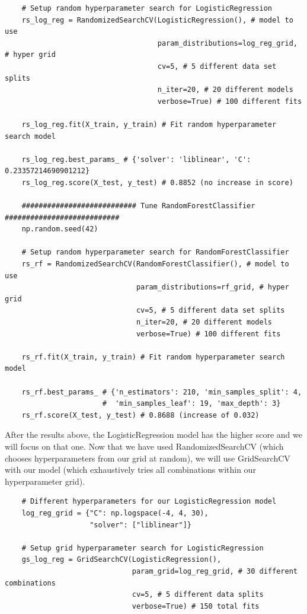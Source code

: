 \documentclass[11pt, a4paper]{article}
\begin{document}
\begin{spacing}{1.1}
\begin{lstlisting}
	# Setup random hyperparameter search for LogisticRegression
	rs_log_reg = RandomizedSearchCV(LogisticRegression(), # model to use
	                                param_distributions=log_reg_grid, # hyper grid
	                                cv=5, # 5 different data set splits
	                                n_iter=20, # 20 different models
	                                verbose=True) # 100 different fits
	
	rs_log_reg.fit(X_train, y_train) # Fit random hyperparameter search model
	
	rs_log_reg.best_params_ # {'solver': 'liblinear', 'C': 0.23357214690901212}
	rs_log_reg.score(X_test, y_test) # 0.8852 (no increase in score)
	
	########################### Tune RandomForestClassifier ###########################
	np.random.seed(42)
	
	# Setup random hyperparameter search for RandomForestClassifier
	rs_rf = RandomizedSearchCV(RandomForestClassifier(), # model to use
	                           param_distributions=rf_grid, # hyper grid
	                           cv=5, # 5 different data set splits
	                           n_iter=20, # 20 different models
	                           verbose=True) # 100 different fits
	
	rs_rf.fit(X_train, y_train) # Fit random hyperparameter search model 
	
	rs_rf.best_params_ # {'n_estimators': 210, 'min_samples_split': 4, 
	                   #  'min_samples_leaf': 19, 'max_depth': 3}
	rs_rf.score(X_test, y_test) # 0.8688 (increase of 0.032) \end{lstlisting} \newpage

	\noindent After the results above, the LogisticRegression model has the higher score and we will focus on that one. Now that we have used RandomizedSearchCV (which chooses hyperparameters from our grid at random), we will use GridSearchCV with our model (which exhaustively tries all combinations within our hyperparameter grid). 
	\begin{lstlisting}
	# Different hyperparameters for our LogisticRegression model
	log_reg_grid = {"C": np.logspace(-4, 4, 30),
	                "solver": ["liblinear"]}
	                
	# Setup grid hyperparameter search for LogisticRegression
	gs_log_reg = GridSearchCV(LogisticRegression(),
	                          param_grid=log_reg_grid, # 30 different combinations
	                          cv=5, # 5 different data splits
	                          verbose=True) # 150 total fits
	

\end{lstlisting}
\end{spacing}
\end{document}
